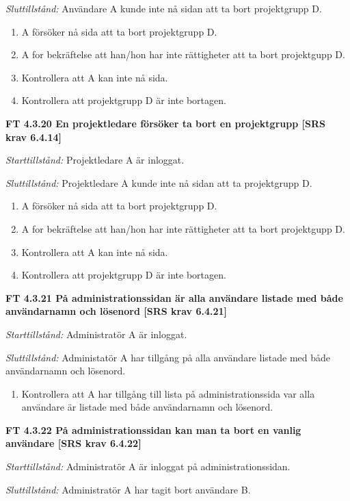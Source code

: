 \documentclass[a4paper]{article}
\begin{document}
\emph{Sluttillstånd:} Användare A kunde inte nå sidan att ta bort projektgrupp D.

\begin{enumerate}
\item A försöker nå sida att ta bort projektgrupp D.
\item A for bekräftelse att han/hon har inte rättigheter att ta bort projektgupp D.
\item Kontrollera att A kan inte nå sida.
\item Kontrollera att projektgrupp D är inte bortagen.
\end{enumerate}

\textbf{FT 4.3.20 En projektledare försöker ta bort en projektgrupp [SRS krav 6.4.14]}

\emph{Starttillstånd:} Projektledare A är inloggat.

\emph{Sluttillstånd:} Projektledare A kunde inte nå sidan att ta projektgrupp D.

\begin{enumerate}
\item A försöker nå sida att ta bort projektgrupp D.
\item A for bekräftelse att han/hon har inte rättigheter att ta bort projektgupp D.
\item Kontrollera att A kan inte nå sida.
\item Kontrollera att projektgrupp D är inte bortagen.
\end{enumerate}

\textbf{FT 4.3.21 På administrationssidan är alla användare listade med både användarnamn och lösenord [SRS krav 6.4.21]}

\emph{Starttillstånd:} Administratör A är inloggat.

\emph{Sluttillstånd:} Administatör A har tillgång på alla användare listade med både användarnamn och lösenord.

\begin{enumerate}
\item Kontrollera att A har tillgång till lista på administrationssida var alla användare är listade med både användarnamn och lösenord.
\end{enumerate}

\textbf{FT 4.3.22 På administrationssidan kan man ta bort en vanlig användare [SRS krav 6.4.22]}

\emph{Starttillstånd:} Administratör A är inloggat på administrationssidan.

\emph{Sluttillstånd:} Administratör A har tagit bort  användare B.
\end{document}
